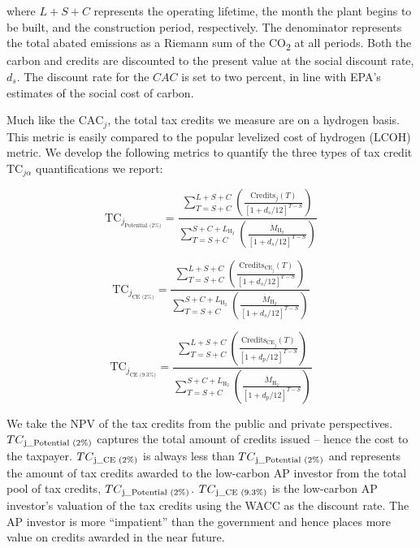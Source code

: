 \documentclass{article}
\begin{document}
where \( L+S+C \) represents the operating lifetime, the month the plant begins to be built, and the construction period, respectively. The denominator represents the total abated emissions as a Riemann sum of the CO\textsubscript{2} at all periods. Both the carbon and credits are discounted to the present value at the social discount rate, \( d_s \). The discount rate for the \( CAC \) is set to two percent, in line with EPA’s estimates of the social cost of carbon\cite{EPA2022}.

Much like the \( \text{CAC}_j \), the total tax credits we measure are on a hydrogen basis. This metric is easily compared to the popular levelized cost of hydrogen (LCOH) metric. We develop the following metrics to quantify the three types of tax credit \( \text{TC}_{j\alpha} \) quantifications we report:

\begin{equation}
\text{TC}_{j_{\text{Potential (2\%)}}} = \frac{\sum_{T=S+C}^{L+S+C} \left(\frac{\text{Credits}_j(T)}{[1 + d_s/12]^{T-S}}\right)}{\sum_{T=S+C}^{S+C+L_{\text{H}_2}} \left(\frac{\dot{M}_{\text{H}_2}}{[1 + d_s/12]^{T-S}}\right)}
\label{eq:S47}
\end{equation}

\begin{equation}
\text{TC}_{j_{\text{CE (2\%)}}} = \frac{\sum_{T=S+C}^{L+S+C} \left(\frac{\text{Credits}_{\text{CE}_j}(T)}{[1 + d_s/12]^{T-S}}\right)}{\sum_{T=S+C}^{S+C+L_{\text{H}_2}} \left(\frac{\dot{M}_{\text{H}_2}}{[1 + d_s/12]^{T-S}}\right)}
\label{eq:S48}
\end{equation}

\begin{equation}
\text{TC}_{j_{\text{CE (9.3\%)}}} = \frac{\sum_{T=S+C}^{L+S+C} \left(\frac{\text{Credits}_{\text{CE}_j}(T)}{[1 + d_p/12]^{T-S}}\right)}{\sum_{T=S+C}^{S+C+L_{\text{H}_2}} \left(\frac{\dot{M}_{\text{H}_2}}{[1 + d_p/12]^{T-S}}\right)}
\label{eq:S49}
\end{equation}

We take the NPV of the tax credits from the public and private perspectives. \( TC\textsubscript{j\_Potential (2\%)} \) captures the total amount of credits issued – hence the cost to the taxpayer. \( TC\textsubscript{j\_CE (2\%)} \) is always less than \( TC\textsubscript{j\_Potential (2\%)} \) and represents the amount of tax credits awarded to the low-carbon AP investor from the total pool of tax credits, \( TC\textsubscript{j\_Potential (2\%)} \). \( TC\textsubscript{j\_CE (9.3\%)} \) is the low-carbon AP investor’s valuation of the tax credits using the WACC as the discount rate. The AP investor is more “impatient” than the government and hence places more value on credits awarded in the near future.
\end{document}
